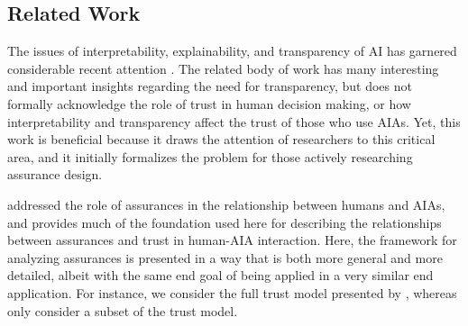 
\subsection{Related Work}\label{sec:rel_work}
    The issues of interpretability, explainability, and transparency of AI has garnered considerable recent attention \cite{Doshi-Velez2017-xy, Weller2017-zx, Lipton2016-ug, Gunning2017-ih}. The related body of work has many interesting and important insights regarding the need for transparency, but does not formally acknowledge the role of trust in human decision making, or how interpretability and transparency affect the trust of those who use AIAs. Yet, this work is beneficial because it draws the attention of researchers to this critical area, and it initially formalizes the problem for those actively researching assurance design.

    \citet{Lillard2016-yg} addressed the role of assurances in the relationship between humans and AIAs, and provides much of the foundation used here for describing the relationships between assurances and trust in human-AIA interaction. Here, the framework for analyzing assurances is presented in a way that is both more general and more detailed, albeit with the same end goal of being applied in a very similar end application. For instance, we consider the full trust model presented by \citet{McKnight2001-fa}, whereas \citeauthor{Lillard2016-yg} only consider a subset of the trust model.

